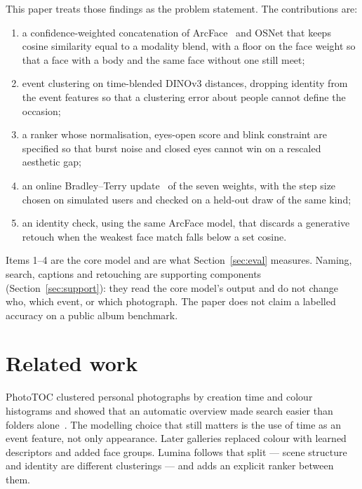 \documentclass[conference]{IEEEtran}
\begin{document}
This paper treats those findings as the problem statement. The contributions
are:
\begin{enumerate}
\item a confidence-weighted concatenation of ArcFace~\cite{deng2019arcface}
and OSNet that keeps cosine similarity equal to a modality blend, with a floor
on the face weight so that a face with a body and the same face without one
still meet;
\item event clustering on time-blended \mbox{DINOv3} distances, dropping identity
from the event features so that a clustering error about people cannot define
the occasion;
\item a ranker whose normalisation, eyes-open score and blink constraint are
specified so that burst noise and closed eyes cannot win on a rescaled
aesthetic gap;
\item an online Bradley--Terry update~\cite{bradley1952rank} of the seven
weights, with the step size chosen on simulated users and checked on a held-out
draw of the same kind;
\item an identity check, using the same ArcFace model, that discards a
generative retouch when the weakest face match falls below a set cosine.
\end{enumerate}
Items 1--4 are the core model and are what Section~\ref{sec:eval} measures.
Naming, search, captions and retouching are supporting components
(Section~\ref{sec:support}): they read the core model's output and do not
change who, which event, or which photograph. The paper does not claim a
labelled accuracy on a public album benchmark.

\section{Related work}
\label{sec:related}

PhotoTOC clustered personal photographs by creation time and colour histograms
and showed that an automatic overview made search easier than folders
alone~\cite{platt2003phototoc}. The modelling choice that still matters is the
use of time as an event feature, not only appearance. Later galleries replaced
colour with learned descriptors and added face groups. Lumina follows that
split --- scene structure and identity are different clusterings --- and adds
an explicit ranker between them.
\end{document}
